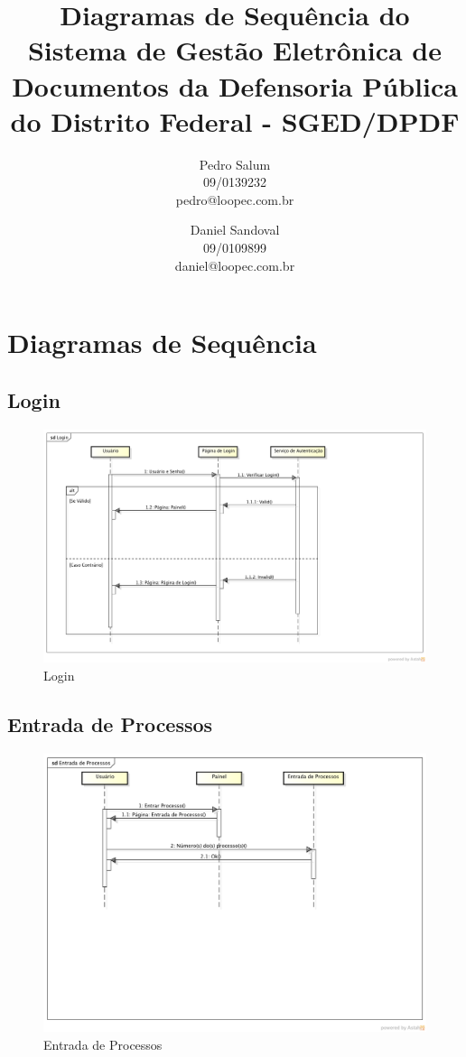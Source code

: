 \documentclass[12pt,a4paper]{report}
\title{Diagramas de Sequência do Sistema de Gestão Eletrônica de Documentos da Defensoria Pública do Distrito Federal - SGED/DPDF}
\author{Pedro Salum\\
	09/0139232\\
	pedro@loopec.com.br
	\and
	Daniel Sandoval\\
	09/0109899\\
	daniel@loopec.com.br}
\begin{document}
\maketitle
\tableofcontents

\chapter{Diagramas de Sequência}

\section{Login}
\begin{figure}[H]
\centering
\includegraphics[width=\textwidth]{login.png}
\caption{Login}
\label{fig:login}
\end{figure}

\section{Entrada de Processos}
\begin{figure}[H]
\centering
\includegraphics[width=\textwidth]{entrada-de-processos.png}
\caption{Entrada de Processos}
\label{fig:entrada}
\end{figure}
\end{document}
